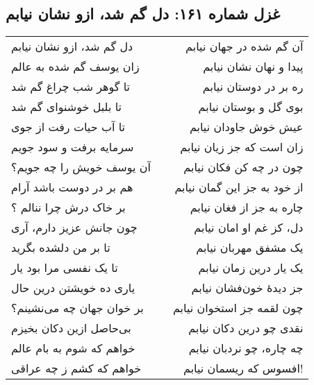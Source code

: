 \begin{center}
\section*{غزل شماره ۱۶۱: دل گم شد، ازو نشان نیابم}
\label{sec:161}
\begin{longtable}{l p{0.5cm} r}
دل گم شد، ازو نشان نیابم
&&
آن گم شده در جهان نیابم
\\
زان یوسف گم شده به عالم
&&
پیدا و نهان نشان نیابم
\\
تا گوهر شب چراغ گم شد
&&
ره بر در دوستان نیابم
\\
تا بلبل خوشنوای گم شد
&&
بوی گل و بوستان نیابم
\\
تا آب حیات رفت از جوی
&&
عیش خوش جاودان نیابم
\\
سرمایه برفت و سود جویم
&&
زان است که جز زیان نیابم
\\
آن یوسف خویش را چه جویم؟
&&
چون در چه کن فکان نیابم
\\
هم بر در دوست باشد آرام
&&
از خود به جز این گمان نیابم
\\
بر خاک درش چرا ننالم ؟
&&
چاره به جز از فغان نیابم
\\
چون جانش عزیز دارم، آری
&&
دل، کز غم او امان نیابم
\\
تا بر من دلشده بگرید
&&
یک مشفق مهربان نیابم
\\
تا یک نفسی مرا بود یار
&&
یک یار درین زمان نیابم
\\
یاری ده خویشتن درین حال
&&
جز دیدهٔ خون‌فشان نیابم
\\
بر خوان جهان چه می‌نشینم؟
&&
چون لقمه جز استخوان نیابم
\\
بی‌حاصل ازین دکان بخیزم
&&
نقدی چو درین دکان نیابم
\\
خواهم که شوم به بام عالم
&&
چه چاره، چو نردبان نیابم
\\
خواهم که کشم ز چه عراقی
&&
افسوس که ریسمان نیابم!
\\
\end{longtable}
\end{center}
